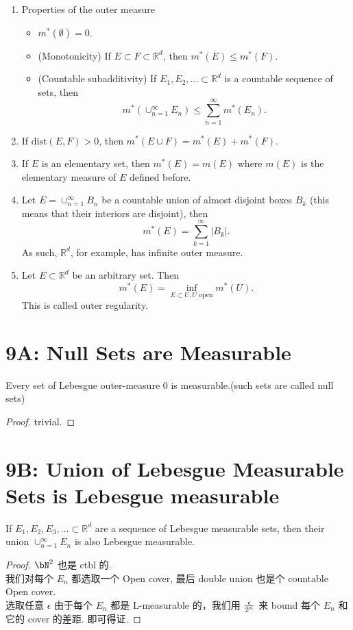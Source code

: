 \documentclass[lang=cn,11pt]{template}
\begin{document}
\begin{enumerate}
    \item Properties of the outer measure
    \begin{itemize}
        \item \( m^*(\emptyset) = 0 \).
        \item (Monotonicity) If \( E \subset F \subset \mathbb{R}^d \), then \( m^*(E) \leq m^*(F) \).
        \item (Countable subadditivity) If \( E_1, E_2, \ldots \subset \mathbb{R}^d \) is a countable sequence of sets, then
        \[
        m^*\left(\cup_{n=1}^{\infty} E_n\right) \leq \sum_{n=1}^{\infty} m^*(E_n).
        \]
    \end{itemize}
    \item If \( \text{dist}(E, F) > 0 \), then \( m^*(E \cup F) = m^*(E) + m^*(F) \).
    \item If \( E \) is an elementary set, then \( m^*(E) = m(E) \) where \( m(E) \) is the elementary measure of \( E \) defined before.
    \item Let \( E = \cup_{n=1}^{\infty} B_n \) be a countable union of almost disjoint boxes \( B_k \) (this means that their interiors are disjoint), then
    \[
    m^*(E) = \sum_{k=1}^{\infty} |B_k|.
    \]
    As such, \( \mathbb{R}^d \), for example, has infinite outer measure.
    \item Let \( E \subset \mathbb{R}^d \) be an arbitrary set. Then
    \[
    m^*(E) = \inf_{E \subset U, U \text{ open}} m^*(U).
    \]
    This is called outer regularity.
\end{enumerate}

\section*{9A: Null Sets are Measurable}
\begin{theorem}
Every set of Lebesgue outer-measure 0 is measurable.(such sets are called null sets)
\end{theorem}
\begin{proof}
    trivial.
\end{proof}

\section*{9B: Union of Lebesgue Measurable Sets is Lebesgue measurable} 
\begin{theorem}
If \( E_1, E_2, E_3, \ldots \subset \mathbb{R}^d \) are a sequence of Lebesgue measurable sets, then their union \( \cup_{n=1}^{\infty} E_n \) is also Lebesgue measurable.
\end{theorem}
\begin{proof}
    $\bN^2$ 也是 ctbl 的.\\
    我们对每个 $E_n$ 都选取一个 Open cover, 最后 double union 也是个 countable Open cover.\\
    选取任意 $\epsilon$
    由于每个 $E_n$ 都是 L-measurable 的，我们用 $\epsilon \over {2^n}$ 来 bound 每个 $E_n$ 和它的 cover 的差距. 即可得证.
\end{proof}
\end{document}
